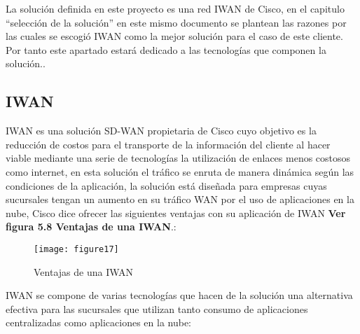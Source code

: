 La solución definida en este proyecto es una red IWAN de Cisco, en el capitulo “selección de la solución” en este mismo documento se plantean las razones por las cuales se escogió IWAN como la mejor solución para el caso de este cliente. Por tanto este apartado estará dedicado a las tecnologías que componen la solución..


\subsection{IWAN}
\label{sec:IWAN}

IWAN es una solución SD-WAN propietaria de Cisco cuyo objetivo es la reducción de costos para el transporte de la información del cliente al hacer viable mediante una serie de tecnologías la utilización de enlaces menos costosos como internet, en esta solución el tráfico se enruta de manera dinámica según las condiciones de la aplicación, la solución está diseñada para empresas cuyas sucursales tengan un aumento en su tráfico WAN por el uso de aplicaciones en la nube, Cisco dice ofrecer las siguientes ventajas con su aplicación de IWAN \textbf{Ver figura 5.8 Ventajas de una IWAN}.:

\begin{figure}[htbp]
  \centering
    {\texttt{[image: figure17]}}%
  \caption{Ventajas de una IWAN}
  \label{fig:fig2subfig}
\end{figure}
IWAN se compone de varias tecnologías que hacen de la solución una alternativa efectiva para las sucursales que utilizan tanto consumo de aplicaciones centralizadas como aplicaciones en la nube:



